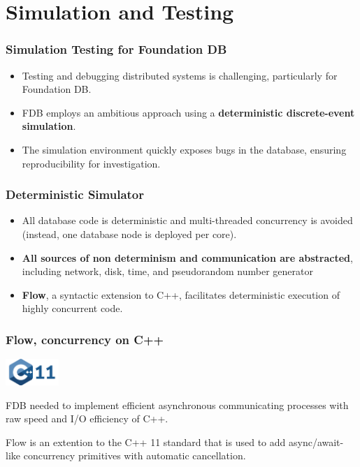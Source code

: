 \section{Simulation and Testing }

\begin{frame}
    \frametitle{Simulation Testing for Foundation DB}
    \begin{itemize}
        \item Testing and debugging distributed systems is challenging, particularly for Foundation DB.
        \item FDB employs an ambitious approach using a \textbf{deterministic discrete-event simulation}.
        \item The simulation environment quickly exposes bugs in the database, ensuring reproducibility for investigation.
    \end{itemize}
\end{frame}
\begin{frame}
    \frametitle{Deterministic Simulator}
    \begin{itemize}
        \item All database code is deterministic and multi-threaded concurrency is avoided (instead, one database node is deployed per core).
        \item \textbf{All sources of non determinism and communication are abstracted}, including network, disk, time, and pseudorandom number generator
        \item \textbf{Flow}, a syntactic extension to C++, facilitates deterministic execution of highly concurrent code.
    \end{itemize}
\end{frame}

\begin{frame}
    \frametitle{Flow, concurrency on C++}
    \includegraphics[width=2cm]{img/3-Testing/cpp.png}

    \vspace{0.5cm}
   FDB needed to implement efficient asynchronous communicating processes with raw speed and I/O efficiency of C++.
\vspace{0.5cm}

Flow is an extention to the C++ 11 standard that is used to add async/await-like
concurrency primitives with automatic cancellation.

   
\end{frame}

